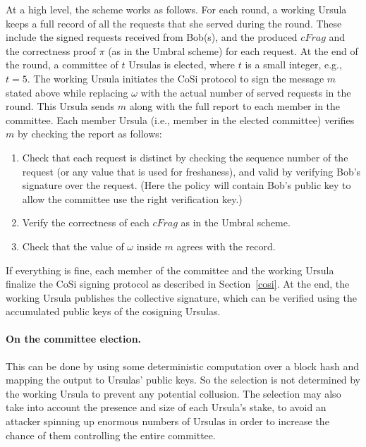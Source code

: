 At a high level, the scheme works as follows. For each round, a working Ursula keeps 
a full record of all the requests that she served during the round. These 
include the signed requests received from Bob(s), and the produced $cFrag$ 
and the correctness proof $\pi$ (as in the Umbral scheme) for 
each request. At the end of the round, a committee of $t$ Ursulas is 
elected, where $t$ is a small integer, e.g., $t = 5$. The working Ursula 
initiates the CoSi protocol to sign the message $m$ stated above while 
replacing $\omega$ with the actual number of served 
requests in the round. This Ursula sends $m$ along with the full report to 
each member in the committee. Each member Ursula (i.e., member in the 
elected committee) verifies $m$ by checking the report as follows:
\begin{enumerate}
\setlength{\itemsep}{0pt}
\item Check that each request is distinct by checking the sequence 
number of the request (or any value that is used for freshaness), and valid by verifying Bob's 
signature over the request. (Here the policy will contain Bob's public 
key to allow the committee use the right verification key.)


\item Verify the correctness of each $cFrag$ as in the Umbral 
scheme.

\item Check that the value of $\omega$ inside $m$ agrees with the 
record.
\end{enumerate}


If everything is fine, each member of the committee and the working 
Ursula finalize the CoSi signing protocol as described in Section~\ref{cosi}. 
At the end, the working Ursula publishes the collective signature, which can be 
verified using the accumulated public keys of the cosigning Ursulas.


\paragraph{On the committee election.} This can be done
by using some deterministic computation over a block hash and mapping
the output to Ursulas' public keys. So the selection is not determined by the
working Ursula to prevent any potential collusion. The selection may also take into account the presence and size of each Ursula's stake, to avoid an attacker spinning up enormous numbers of Ursulas in order to increase the chance of them controlling the entire committee.


